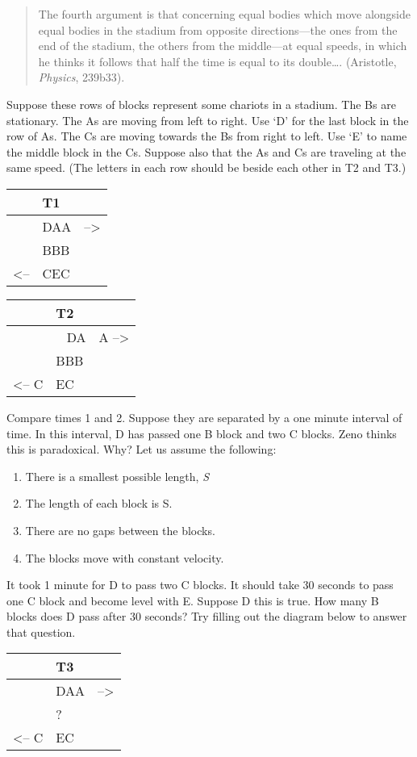 \documentclass[oneside]{article}
\begin{document}
\begin{quote}
The fourth argument is that concerning equal bodies which move alongside equal bodies in the stadium from opposite directions---the ones from the end of the stadium, the others from the middle---at equal speeds, in which he thinks it follows that half the time is equal to its
double\ldots{}. (Aristotle, \emph{Physics}, 239b33).
\end{quote}
Suppose these rows of blocks represent some chariots in a stadium. The
Bs are stationary. The As are moving from left to right. Use `D' for the last block in the row of As. The Cs are moving towards the Bs from right to left. Use `E' to name the middle block in the Cs. Suppose also that the As and Cs are traveling at the same speed. (The letters in each row should be beside each other in T2 and T3.)

\begin{longtable}[c]{@{}lll@{}}
\toprule
& T1 &\tabularnewline
\midrule
\endhead
& DAA & --\textgreater{}\tabularnewline
& BBB &\tabularnewline
\textless{}-- & CEC &\tabularnewline
\end{longtable}

\begin{longtable}[c]{@{}rll@{}}
\toprule
& T2 &\tabularnewline
\midrule
\endhead
&  ~ DA & A --\textgreater{}\tabularnewline
& BBB &\tabularnewline
 \textless{}-- C& EC &\tabularnewline
\end{longtable}
\noindent Compare times 1 and 2. Suppose they are separated by a one minute
interval of time. In this interval, D has passed one B block and two C blocks. Zeno thinks this is paradoxical. Why? Let us assume the following:

\begin{enumerate}
\item
  There is a smallest possible length, \emph{S}
\item
  The length of each block is S.
\item
  There are no gaps between the blocks.
\item
  The blocks move with constant velocity.
\end{enumerate}
\noindent It took 1 minute for D to pass two C blocks. It should take 30 seconds to
pass one C block and become level with E. Suppose D this is true. How many B blocks does D pass after 30 seconds?  Try filling out the diagram below to answer that question.

\begin{longtable}[c]{@{}rll@{}}
\toprule
& T3 &\tabularnewline
\midrule
\endhead
 & DAA & --\textgreater{}\tabularnewline
& ? &\tabularnewline
 \textless{}--  C& EC & \tabularnewline
\end{longtable}
\end{document}
